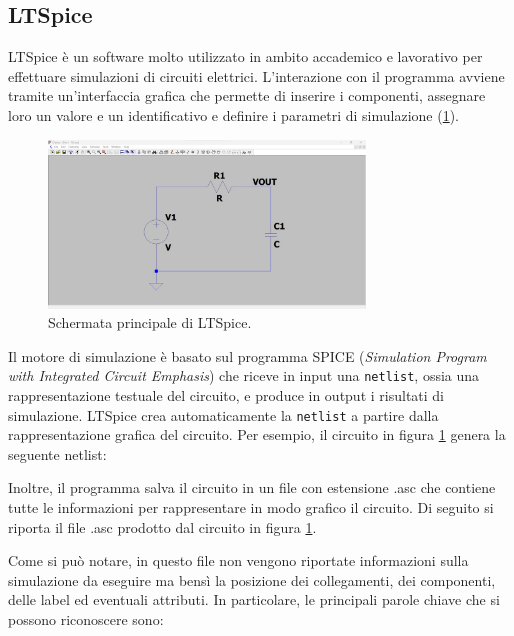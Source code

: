 \subsection{LTSpice}
LTSpice è un software molto utilizzato in ambito accademico e lavorativo per effettuare simulazioni di circuiti elettrici. L'interazione con il programma avviene tramite un'interfaccia grafica che permette di inserire i componenti, assegnare loro un valore e un identificativo e definire i parametri di simulazione (\Fig\ref{fig:ltspice}).
\begin{figure}[h!]
	\centering
	\includegraphics[width=0.75\textwidth]{./ImageFiles/LTSpice.jpg}
	\caption{Schermata principale di LTSpice.}
	\label{fig:ltspice}
\end{figure}
\newpage
\noindent
Il motore di simulazione è basato sul programma SPICE (\textit{Simulation Program with Integrated Circuit Emphasis}) che riceve in input una \texttt{netlist}, ossia una rappresentazione testuale del circuito, e produce in output i risultati di simulazione. LTSpice crea automaticamente la \texttt{netlist} a partire dalla rappresentazione grafica del circuito. Per esempio, il circuito in figura \ref{fig:ltspice} genera la seguente netlist:

Inoltre, il programma salva il circuito in un file con estensione .asc che contiene tutte le informazioni per rappresentare in modo grafico il circuito. Di seguito si riporta il file .asc prodotto dal circuito in figura \ref{fig:ltspice}.

Come si può notare, in questo file non vengono riportate informazioni sulla simulazione da eseguire ma bensì la posizione dei collegamenti, dei componenti, delle label ed eventuali attributi. In particolare, le principali parole chiave che si possono riconoscere sono:

